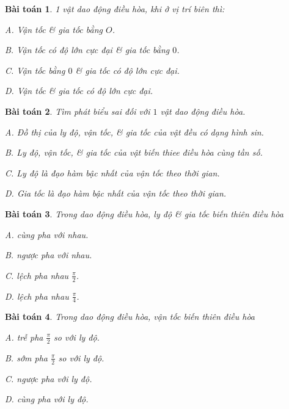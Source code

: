 \documentclass{article}
\numberwithin{equation}{section}
\newtheorem{baitoan}{Bài toán}[section]
\begin{document}
\begin{baitoan}
	1 vật dao động điều hòa, khi ở vị trí biên thì:
	\begin{enumerate*}
		\item[{\rm\sf A.}] Vận tốc \& gia tốc bằng $O$.
		\item[{\rm\sf B.}] Vận tốc có độ lớn cực đại \& gia tốc bằng $0$.
		\item[{\rm\sf C.}] Vận tốc bằng $0$ \& gia tốc có độ lớn cực đại.
		\item[{\rm\sf D.}] Vận tốc \& gia tốc có độ lớn cực đại.
	\end{enumerate*}
\end{baitoan}

\begin{baitoan}
	Tìm phát biểu sai đối với $1$ vật dao động điều hòa.
	\begin{enumerate*}
		\item[{\rm\sf A.}] Đồ thị của ly độ, vận tốc, \& gia tốc của vật đều có dạng hình sin.
		\item[{\rm\sf B.}] Ly độ, vận tốc, \& gia tốc của vật biến thiee điều hòa cùng tần số.
		\item[{\rm\sf C.}] Ly độ là đạo hàm bậc nhất của vận tốc theo thời gian.
		\item[{\rm\sf D.}] Gia tốc là đạo hàm bậc nhất của vận tốc theo thời gian.
	\end{enumerate*}
\end{baitoan}

\begin{baitoan}
	Trong dao động điều hòa, ly độ \& gia tốc biến thiên điều hòa
	\begin{enumerate*}
		\item[{\rm\sf A.}] cùng pha với nhau.
		\item[{\rm\sf B.}] ngược pha với nhau.
		\item[{\rm\sf C.}] lệch pha nhau $\frac{\pi}{2}$.
		\item[{\rm\sf D.}] lệch pha nhau $\frac{\pi}{4}$.
	\end{enumerate*}
\end{baitoan}

\begin{baitoan}
	Trong dao động điều hòa, vận tốc biến thiên điều hòa
	\begin{enumerate*}
		\item[{\rm\sf A.}] trễ pha $\frac{\pi}{2}$ so với ly độ.
		\item[{\rm\sf B.}] sớm pha $\frac{\pi}{2}$ so với ly độ.
		\item[{\rm\sf C.}] ngược pha với ly độ.
		\item[{\rm\sf D.}] cùng pha với ly độ.
	\end{enumerate*}
\end{baitoan}
\end{document}
